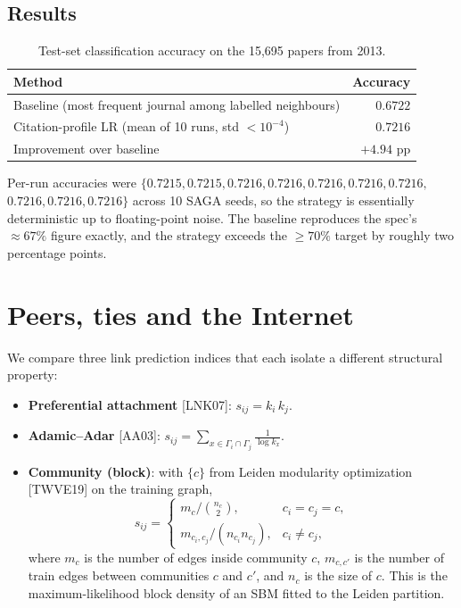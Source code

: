 \documentclass[12pt]{article}
\theoremstyle{definition}
\begin{document}
\subsection*{Results}

\begin{table}[h]
\centering
\caption{Test-set classification accuracy on the 15{,}695 papers from 2013.}
\begin{tabular}{lr}
\toprule
Method & Accuracy \\
\midrule
Baseline (most frequent journal among labelled neighbours)        & $0.6722$ \\
Citation-profile LR (mean of 10 runs, std $< 10^{-4}$)            & $\mathbf{0.7216}$ \\
\midrule
Improvement over baseline                                          & $+4.94$ pp \\
\bottomrule
\end{tabular}
\end{table}

Per-run accuracies were $\{0.7215, 0.7215, 0.7216, 0.7216, 0.7216, 0.7216, 0.7216, $\\ $ 0.7216, 0.7216, 0.7216\}$ across 10 SAGA seeds, so the strategy is essentially deterministic up to floating-point noise. The baseline reproduces the spec's $\approx 67\%$ figure exactly, and the strategy exceeds the $\geq 70\%$ target by roughly two percentage points.



\newpage
\section{Peers, ties and the Internet}

We compare three link prediction indices that each isolate a different structural property:
\begin{itemize}
  \item \textbf{Preferential attachment} [LNK07]: $s_{ij} = k_i\, k_j$.
  \item \textbf{Adamic--Adar} [AA03]: $s_{ij} = \sum_{x \in \Gamma_i \cap \Gamma_j} \tfrac{1}{\log k_x}$.
  \item \textbf{Community (block)}: with $\{c\}$ from Leiden modularity optimization [TWVE19] on the training graph,
  \[
    s_{ij} =
    \begin{cases}
      m_{c} \big/ \binom{n_{c}}{2}, & c_i = c_j = c, \\[2pt]
      m_{c_i, c_j} \big/ (n_{c_i} n_{c_j}), & c_i \ne c_j,
    \end{cases}
  \]
  where $m_c$ is the number of edges inside community $c$, $m_{c,c'}$ is the number of train edges between communities $c$ and $c'$, and $n_c$ is the size of $c$. This is the maximum-likelihood block density of an SBM fitted to the Leiden partition.
\end{itemize}
\end{document}

